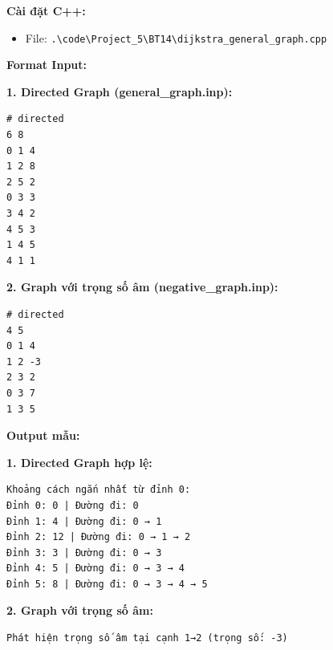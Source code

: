 \documentclass[12pt,a4paper]{article}
\begin{document}
\textbf{Cài đặt C++:}
\begin{itemize}[label=\textbullet]
   \item File: \texttt{.\textbackslash code\textbackslash Project\_5\textbackslash BT14\textbackslash dijkstra\_general\_graph.cpp}
\end{itemize}

\textbf{Format Input:}

\textbf{1. Directed Graph (general\_graph.inp):}
\begin{verbatim}
# directed
6 8
0 1 4
1 2 8
2 5 2
0 3 3
3 4 2
4 5 3
1 4 5
4 1 1
\end{verbatim}

\textbf{2. Graph với trọng số âm (negative\_graph.inp):}
\begin{verbatim}
# directed
4 5
0 1 4
1 2 -3
2 3 2
0 3 7
1 3 5
\end{verbatim}

\textbf{Output mẫu:}

\textbf{1. Directed Graph hợp lệ:}
\begin{verbatim}
Khoảng cách ngắn nhất từ đỉnh 0:
Đỉnh 0: 0 | Đường đi: 0
Đỉnh 1: 4 | Đường đi: 0 → 1
Đỉnh 2: 12 | Đường đi: 0 → 1 → 2
Đỉnh 3: 3 | Đường đi: 0 → 3
Đỉnh 4: 5 | Đường đi: 0 → 3 → 4
Đỉnh 5: 8 | Đường đi: 0 → 3 → 4 → 5
\end{verbatim}

\textbf{2. Graph với trọng số âm:}
\begin{verbatim}
Phát hiện trọng số âm tại cạnh 1→2 (trọng số: -3)
\end{verbatim}
\end{document}
